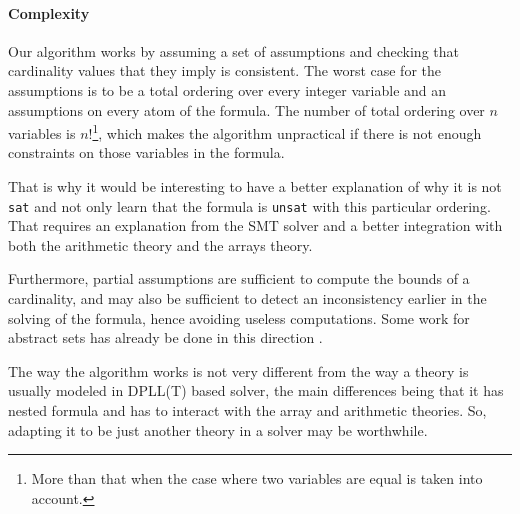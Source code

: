 \documentclass[]{article}
\begin{document}
{\paragraph{Complexity}

Our algorithm works by assuming a set of assumptions and checking that
cardinality values that they imply is consistent. The worst case for the
assumptions is to be a total ordering over every integer variable and an
assumptions on every atom of the formula. The number of total ordering
over $n$ variables is
$n!$\footnote{More than that when the case where two variables are equal is taken into account.},
which makes the algorithm unpractical if there is not enough constraints
on those variables in the formula.

That is why it would be interesting to have a better explanation of why
it is not \texttt{sat} and not only learn that the formula is
\texttt{unsat} with this particular ordering. That requires an
explanation from the SMT solver and a better integration with both the
arithmetic theory and the arrays theory.

Furthermore, partial assumptions are sufficient to compute the bounds of
a cardinality, and may also be sufficient to detect an inconsistency
earlier in the solving of the formula, hence avoiding useless
computations. Some work for abstract sets has already be done in this
direction \cite{cardinalityset}.

The way the algorithm works is not very different from the way a theory
is usually modeled in DPLL(T) based solver, the main differences being
that it has nested formula and has to interact with the array and
arithmetic theories. So, adapting it to be just another theory in a
solver may be worthwhile.

}{}

\newpage


\end{document}
